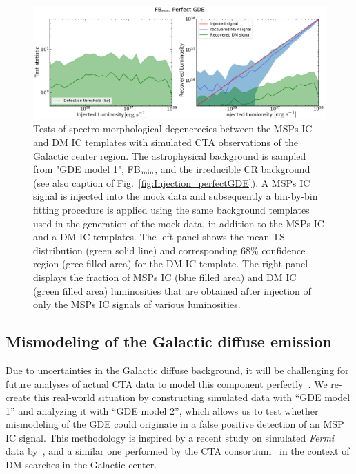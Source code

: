 \documentclass[doublespace,nopageskip]{VTthesis} %
\begin{document}
\begin{figure}[htb]
    \begin{center}
    \includegraphics[width=\textwidth]{Figures/CTA/TS-dm-mis-False-Fermi-min-True.pdf}
    \caption{Tests of spectro-morphological degenerecies between the MSPs IC and DM IC templates with simulated CTA observations of the Galactic center region. The astrophysical background is sampled from "GDE model 1", FB$_{\rm min}$, and the irreducible CR background (see also caption of Fig.~\ref{fig:Injection_perfectGDE}). A MSPs IC signal is injected into the mock data and subsequently a bin-by-bin fitting procedure is applied using the same background templates used in the generation of the mock data, in addition to the MSPs IC and a DM IC templates. The left panel shows the mean TS distribution (green solid line) and corresponding 68\% confidence region (gree filled area) for the DM IC template. The right panel displays the fraction of MSPs IC (blue filled area) and DM IC (green filled area) luminosities that are obtained after injection of only the MSPs IC signals of various luminosities. }
    \label{fig:MSPsvsDM_perfectGDE}
    \end{center}
\end{figure}

\subsection{Mismodeling of the Galactic diffuse emission}
\label{subsec:GDEmismodeling}

Due to uncertainties in the Galactic diffuse background, it will be challenging for future analyses of actual CTA data to model this component perfectly~\citep{Acharyya:2020sbj}. 
%
We re-create this  
real-world situation
by constructing simulated data with ``GDE model 1'' and analyzing it with ``GDE model 2'', which allows us to test whether mismodeling of the GDE could originate in a false positive detection of an MSP IC signal. This methodology is inspired by a recent study on simulated {\it Fermi} data by~\citep{Chang:2019ars}, and a similar one performed by the CTA consortium~\citep{Acharyya:2020sbj} in the context of DM searches in the Galactic center. 
\end{document}
